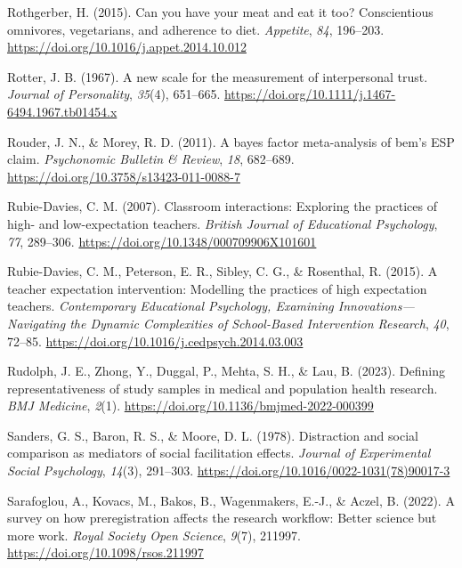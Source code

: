 \documentclass[
  letterpaper,
]{book}
\newlength{\cslhangindent}
\newenvironment{CSLReferences}[2] %
 {\begin{list}{}{%
  \setlength{\itemindent}{0pt}
  \setlength{\leftmargin}{0pt}
  \setlength{\parsep}{0pt}
  \ifodd #1
   \setlength{\leftmargin}{\cslhangindent}
   \setlength{\itemindent}{-1\cslhangindent}
  \fi
  \setlength{\itemsep}{#2\baselineskip}}}
 {\end{list}}
\begin{document}
\begin{CSLReferences}{1}{0}
Rothgerber, H. (2015). {Can you have your meat and eat it too?
Conscientious omnivores, vegetarians, and adherence to diet}.
\emph{{Appetite}}, \emph{84}, 196--203.
\url{https://doi.org/10.1016/j.appet.2014.10.012}

Rotter, J. B. (1967). A new scale for the measurement of interpersonal
trust. \emph{Journal of Personality}, \emph{35}(4), 651--665.
\url{https://doi.org/10.1111/j.1467-6494.1967.tb01454.x}

Rouder, J. N., \& Morey, R. D. (2011). A bayes factor meta-analysis of
bem's ESP claim. \emph{Psychonomic Bulletin \& Review}, \emph{18},
682--689. \url{https://doi.org/10.3758/s13423-011-0088-7}

Rubie-Davies, C. M. (2007). Classroom interactions: Exploring the
practices of high- and low-expectation teachers. \emph{British Journal
of Educational Psychology}, \emph{77}, 289--306.
\url{https://doi.org/10.1348/000709906X101601}

Rubie-Davies, C. M., Peterson, E. R., Sibley, C. G., \& Rosenthal, R.
(2015). A teacher expectation intervention: {Modelling} the practices of
high expectation teachers. \emph{Contemporary Educational Psychology,
Examining {Innovations}---{Navigating} the {Dynamic} {Complexities} of
{School}-{Based} {Intervention} {Research}}, \emph{40}, 72--85.
\url{https://doi.org/10.1016/j.cedpsych.2014.03.003}

Rudolph, J. E., Zhong, Y., Duggal, P., Mehta, S. H., \& Lau, B. (2023).
Defining representativeness of study samples in medical and population
health research. \emph{BMJ Medicine}, \emph{2}(1).
\url{https://doi.org/10.1136/bmjmed-2022-000399}

Sanders, G. S., Baron, R. S., \& Moore, D. L. (1978). Distraction and
social comparison as mediators of social facilitation effects.
\emph{Journal of Experimental Social Psychology}, \emph{14}(3),
291--303. \url{https://doi.org/10.1016/0022-1031(78)90017-3}

Sarafoglou, A., Kovacs, M., Bakos, B., Wagenmakers, E.-J., \& Aczel, B.
(2022). A survey on how preregistration affects the research workflow:
Better science but more work. \emph{Royal Society Open Science},
\emph{9}(7), 211997. \url{https://doi.org/10.1098/rsos.211997}


\end{CSLReferences}
\end{document}
